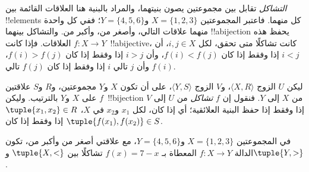 \documentclass[../../../include/open-logic-section]{subfiles}
\begin{document}

\begin{explain}
\emph{التشاكل} تقابل بين مجموعتين يصون بنيتهما، والمراد بالبنية هنا
العلاقات القائمة بين !!{element}s كل منهما. فاعتبر المجموعتين
$X=\{1,2,3\}$ و$Y=\{4,5,6\}$؛ ففي كل واحدة منهما علاقات التالي، وأصغر
من، وأكبر من. والتشاكل بينهما !!a{bijection} يحفظ هذه العلاقات. فإذا
  كانت $f \colon X \to Y$~!!a{bijective}، كانت تشاكلًا متى تحقق،
لكل $i,j\in X$، أن $i<j$ إذا وفقط إذا كان $f(i)<f(j)$، وأن $i>j$ إذا
وفقط إذا كان $f(i)>f(j)$، وأن $j$ تالي $i$ إذا وفقط إذا كان $f(j)$ تالي
$f(i)$.
\end{explain}

\begin{defn}[التشاكل]
ليكن $U$ الزوج $\langle X, R\rangle$، و$V$ الزوج $\langle
Y, S\rangle$، على أن تكون $X$ و$Y$ مجموعتين، و$R$ و$S$ علاقتين على
$X$ و$Y$ بالترتيب. وليكن $f$~!!{bijection} من $X$ إلى $Y$. فنقول إن
$f$ \emph{تشاكل} من $U$ إلى $V$ إذا وفقط إذا حفظ البنية العلائقية؛
أي إذا كان، لكل $x_{1}$ و$x_{2}$ في $X$،
$\tuple{x_1,x_2} \in R$ إذا وفقط إذا كان $\tuple{f(x_1),f(x_2)} \in S$.
\end{defn}

\begin{ex}
في المجموعتين $X=\{1,2,3\}$ و$Y=\{4,5,6\}$، مع علاقتي
أصغر من وأكبر من، تكون الدالة $f\colon X \to Y$ المعطاة بـ
$f(x) = 7-x$ تشاكلًا بين $\tuple{X,<}$ و$\tuple{Y,>}$.
\end{ex}
\end{document}
